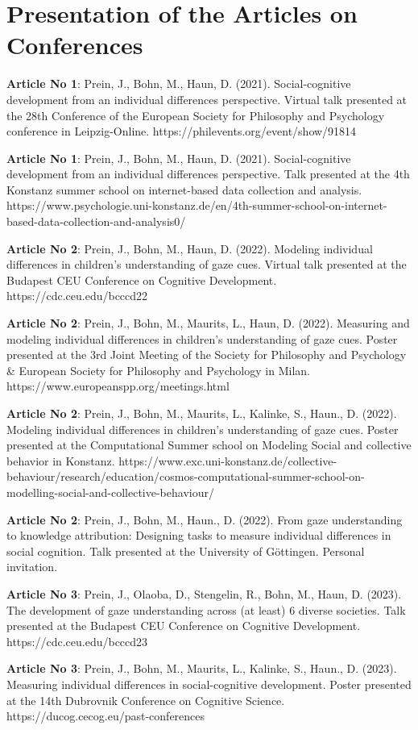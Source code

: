 \documentclass[
]{scrbook}
\begin{document}
\section*{Presentation of the Articles on Conferences}\label{presentation-of-the-articles-on-conferences}

\begin{hangparas}{5mm}{1}
\textbf{Article No 1}: Prein, J., Bohn, M., Haun, D. (2021). Social-cognitive development from an individual differences perspective. Virtual talk presented at the 28th Conference of the European Society for Philosophy and Psychology conference in Leipzig-Online. https://philevents.org/event/show/91814

\textbf{Article No 1}: Prein, J., Bohn, M., Haun, D. (2021). Social-cognitive development from an individual differences perspective. Talk presented at the 4th Konstanz summer school on internet-based data collection and analysis. https://www.psychologie.uni-konstanz.de/en/4th-summer-school-on-internet-based-data-collection-and-analysis0/

\textbf{Article No 2}: Prein, J., Bohn, M., Haun, D. (2022). Modeling individual differences in children’s understanding of gaze cues. Virtual talk presented at the Budapest CEU Conference on Cognitive Development. https://cdc.ceu.edu/bcccd22

\textbf{Article No 2}: Prein, J., Bohn, M., Maurits, L., Haun, D. (2022). Measuring and modeling individual differences in children’s understanding of gaze cues. Poster presented at the 3rd Joint Meeting of the Society for Philosophy and Psychology \& European Society for Philosophy and Psychology in Milan. https://www.europeanspp.org/meetings.html

\textbf{Article No 2}: Prein, J., Bohn, M., Maurits, L., Kalinke, S., Haun., D. (2022). Modeling individual differences in children’s understanding of gaze cues. Poster presented at the Computational Summer school on Modeling Social and collective behavior in Konstanz. https://www.exc.uni-konstanz.de/collective-behaviour/research/education/cosmos-computational-summer-school-on-modelling-social-and-collective-behaviour/

\textbf{Article No 2}: Prein, J., Bohn, M., Haun., D. (2022). From gaze understanding to knowledge attribution: Designing tasks to measure individual differences in social cognition. Talk presented at the University of Göttingen. Personal invitation.

\textbf{Article No 3}: Prein, J., Olaoba, D., Stengelin, R., Bohn, M., Haun, D. (2023). The development of gaze understanding across (at least) 6 diverse societies. Talk presented at the Budapest CEU Conference on Cognitive Development. https://cdc.ceu.edu/bcccd23

\textbf{Article No 3}: Prein, J., Bohn, M., Maurits, L., Kalinke, S., Haun., D. (2023). Measuring individual differences in social-cognitive development. Poster presented at the 14th Dubrovnik Conference on Cognitive Science. https://ducog.cecog.eu/past-conferences

\end{hangparas}
\end{document}
